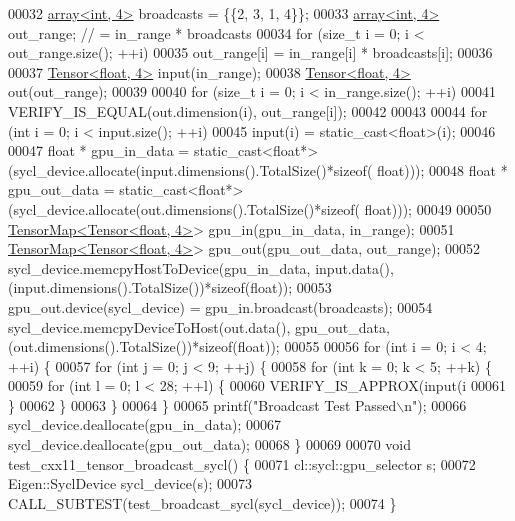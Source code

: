 \begin{DoxyCode}
00032   \hyperlink{class_eigen_1_1array}{array<int, 4>} broadcasts = \{\{2, 3, 1, 4\}\};
00033   \hyperlink{class_eigen_1_1array}{array<int, 4>} out\_range;  \textcolor{comment}{// = in\_range * broadcasts}
00034   \textcolor{keywordflow}{for} (\textcolor{keywordtype}{size\_t} i = 0; i < out\_range.size(); ++i)
00035     out\_range[i] = in\_range[i] * broadcasts[i];
00036 
00037   \hyperlink{class_eigen_1_1_tensor}{Tensor<float, 4>}  input(in\_range);
00038   \hyperlink{class_eigen_1_1_tensor}{Tensor<float, 4>} out(out\_range);
00039 
00040   \textcolor{keywordflow}{for} (\textcolor{keywordtype}{size\_t} i = 0; i < in\_range.size(); ++i)
00041     VERIFY\_IS\_EQUAL(out.dimension(i), out\_range[i]);
00042 
00043 
00044   \textcolor{keywordflow}{for} (\textcolor{keywordtype}{int} i = 0; i < input.size(); ++i)
00045     input(i) = \textcolor{keyword}{static\_cast<}\textcolor{keywordtype}{float}\textcolor{keyword}{>}(i);
00046 
00047   \textcolor{keywordtype}{float} * gpu\_in\_data  = \textcolor{keyword}{static\_cast<}\textcolor{keywordtype}{float}*\textcolor{keyword}{>}(sycl\_device.allocate(input.dimensions().TotalSize()*\textcolor{keyword}{sizeof}(
      float)));
00048   \textcolor{keywordtype}{float} * gpu\_out\_data  = \textcolor{keyword}{static\_cast<}\textcolor{keywordtype}{float}*\textcolor{keyword}{>}(sycl\_device.allocate(out.dimensions().TotalSize()*\textcolor{keyword}{sizeof}(
      float)));
00049 
00050   \hyperlink{class_eigen_1_1_tensor_map}{TensorMap<Tensor<float, 4>}>  gpu\_in(gpu\_in\_data, in\_range);
00051   \hyperlink{class_eigen_1_1_tensor_map}{TensorMap<Tensor<float, 4>}> gpu\_out(gpu\_out\_data, out\_range);
00052   sycl\_device.memcpyHostToDevice(gpu\_in\_data, input.data(),(input.dimensions().TotalSize())*\textcolor{keyword}{sizeof}(\textcolor{keywordtype}{float}));
00053   gpu\_out.device(sycl\_device) = gpu\_in.broadcast(broadcasts);
00054   sycl\_device.memcpyDeviceToHost(out.data(), gpu\_out\_data,(out.dimensions().TotalSize())*\textcolor{keyword}{sizeof}(\textcolor{keywordtype}{float}));
00055 
00056   \textcolor{keywordflow}{for} (\textcolor{keywordtype}{int} i = 0; i < 4; ++i) \{
00057     \textcolor{keywordflow}{for} (\textcolor{keywordtype}{int} j = 0; j < 9; ++j) \{
00058       \textcolor{keywordflow}{for} (\textcolor{keywordtype}{int} k = 0; k < 5; ++k) \{
00059         \textcolor{keywordflow}{for} (\textcolor{keywordtype}{int} l = 0; l < 28; ++l) \{
00060           VERIFY\_IS\_APPROX(input(i%
00061         \}
00062       \}
00063     \}
00064   \}
00065   printf(\textcolor{stringliteral}{"Broadcast Test Passed\(\backslash\)n"});
00066   sycl\_device.deallocate(gpu\_in\_data);
00067   sycl\_device.deallocate(gpu\_out\_data);
00068 \}
00069 
00070 \textcolor{keywordtype}{void} test\_cxx11\_tensor\_broadcast\_sycl() \{
00071   cl::sycl::gpu\_selector s;
00072   Eigen::SyclDevice sycl\_device(s);
00073   CALL\_SUBTEST(test\_broadcast\_sycl(sycl\_device));
00074 \}
\end{DoxyCode}
